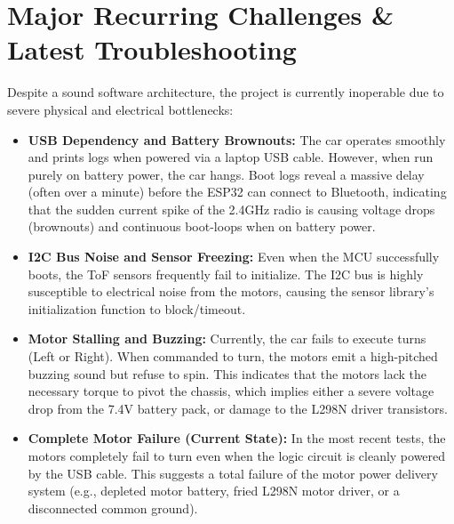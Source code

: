 \documentclass[12pt,a4paper]{article}
\begin{document}
\section{Major Recurring Challenges \& Latest Troubleshooting}
Despite a sound software architecture, the project is currently inoperable due to severe physical and electrical bottlenecks:

\begin{itemize}
    \item \textbf{USB Dependency and Battery Brownouts:} The car operates smoothly and prints logs when powered via a laptop USB cable. However, when run purely on battery power, the car hangs. Boot logs reveal a massive delay (often over a minute) before the ESP32 can connect to Bluetooth, indicating that the sudden current spike of the 2.4GHz radio is causing voltage drops (brownouts) and continuous boot-loops when on battery power.
    \item \textbf{I2C Bus Noise and Sensor Freezing:} Even when the MCU successfully boots, the ToF sensors frequently fail to initialize. The I2C bus is highly susceptible to electrical noise from the motors, causing the sensor library's initialization function to block/timeout.
    \item \textbf{Motor Stalling and Buzzing:} Currently, the car fails to execute turns (Left or Right). When commanded to turn, the motors emit a high-pitched buzzing sound but refuse to spin. This indicates that the motors lack the necessary torque to pivot the chassis, which implies either a severe voltage drop from the 7.4V battery pack, or damage to the L298N driver transistors.
    \item \textbf{Complete Motor Failure (Current State):} In the most recent tests, the motors completely fail to turn even when the logic circuit is cleanly powered by the USB cable. This suggests a total failure of the motor power delivery system (e.g., depleted motor battery, fried L298N motor driver, or a disconnected common ground).
\end{itemize}
\end{document}
